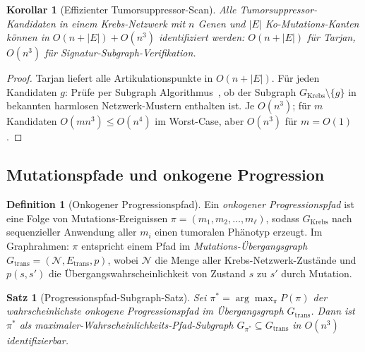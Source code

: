 ﻿\documentclass[a4paper,12pt]{article}
\theoremstyle{plain}
\newtheorem{satz}{Satz}
\newtheorem{korollar}{Korollar}
\theoremstyle{definition}
\newtheorem{definition}{Definition}
\theoremstyle{remark}
\newcommand{\Gkrebs}{G_{\mathrm{Krebs}}}
\begin{document}
\begin{korollar}[Effizienter Tumorsuppressor-Scan]
\label{kor:tumor_scan}
Alle Tumorsuppressor-Kandidaten in einem Krebs-Netzwerk mit
$n$ Genen und $|E|$ Ko-Mutations-Kanten k\"onnen in
$O(n + |E|) + O(n^3)$ identifiziert werden:
$O(n+|E|)$ f\"ur Tarjan, $O(n^3)$ f\"ur Signatur-Subgraph-Verifikation.
\end{korollar}

\begin{proof}
Tarjan liefert alle Artikulationspunkte in $O(n+|E|)$.
F\"ur jeden Kandidaten $g$: Pr\"ufe per Subgraph Algorithmus~\cite{epp2026subgraph},
ob der Subgraph $\Gkrebs \setminus \{g\}$ in bekannten harmlosen
Netzwerk-Mustern enthalten ist. Je $O(n^3)$; f\"ur $m$ Kandidaten
$O(m n^3) \leq O(n^4)$ im Worst-Case, aber $O(n^3)$ f\"ur $m = O(1)$.
\end{proof}

\subsection{Mutationspfade und onkogene Progression}

\begin{definition}[Onkogener Progressionspfad]
\label{def:progression}
Ein \emph{onkogener Progressionspfad} ist eine Folge von Mutations-Ereignissen
$\pi = (m_1, m_2, \ldots, m_\ell)$, sodass $\Gkrebs$ nach sequenzieller
Anwendung aller $m_i$ einen tumoralen Ph\"anotyp erzeugt.
Im Graphrahmen: $\pi$ entspricht einem Pfad im
\emph{Mutations-\"Ubergangsgraph} $G_{\mathrm{trans}} = (\mathcal{N}, E_{\mathrm{trans}}, p)$,
wobei $\mathcal{N}$ die Menge aller Krebs-Netzwerk-Zust\"ande und
$p(s, s')$ die \"Ubergangswahrscheinlichkeit von Zustand $s$ zu $s'$
durch Mutation.
\end{definition}

\begin{satz}[Progressionspfad-Subgraph-Satz]
\label{satz:progression}
Sei $\pi^* = \arg\max_\pi P(\pi)$ der wahrscheinlichste
onkogene Progressionspfad im \"Ubergangsgraph $G_{\mathrm{trans}}$.
Dann ist $\pi^*$ als maximaler-Wahrscheinlichkeits-Pfad-Subgraph
$G_{\pi^*} \subseteq G_{\mathrm{trans}}$ in $O(n^3)$ identifizierbar.
\end{satz}
\end{document}
